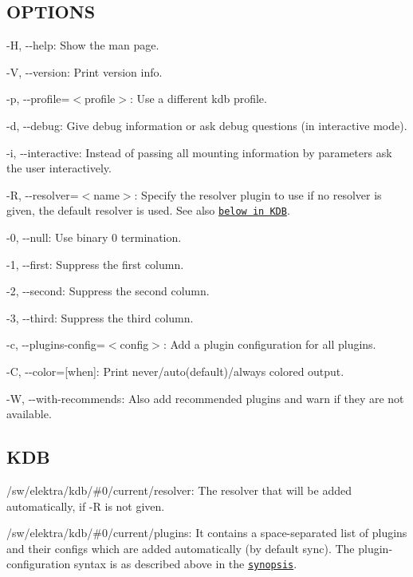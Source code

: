 \subsection*{O\+P\+T\+I\+O\+N\+S}


\begin{DoxyItemize}
\item {\ttfamily -\/\+H}, {\ttfamily -\/-\/help}\+: Show the man page.
\item {\ttfamily -\/\+V}, {\ttfamily -\/-\/version}\+: Print version info.
\item {\ttfamily -\/p}, {\ttfamily -\/-\/profile}=$<$profile$>$\+: Use a different kdb profile.
\item {\ttfamily -\/d}, {\ttfamily -\/-\/debug}\+: Give debug information or ask debug questions (in interactive mode).
\item {\ttfamily -\/i}, {\ttfamily -\/-\/interactive}\+: Instead of passing all mounting information by parameters ask the user interactively.
\item {\ttfamily -\/\+R}, {\ttfamily -\/-\/resolver}=$<$name$>$\+: Specify the resolver plugin to use if no resolver is given, the default resolver is used. See also \href{#KDB}{\tt below in K\+D\+B}.
\item {\ttfamily -\/0}, {\ttfamily -\/-\/null}\+: Use binary 0 termination.
\item {\ttfamily -\/1}, {\ttfamily -\/-\/first}\+: Suppress the first column.
\item {\ttfamily -\/2}, {\ttfamily -\/-\/second}\+: Suppress the second column.
\item {\ttfamily -\/3}, {\ttfamily -\/-\/third}\+: Suppress the third column.
\item {\ttfamily -\/c}, {\ttfamily -\/-\/plugins-\/config}=$<$config$>$\+: Add a plugin configuration for all plugins.
\item {\ttfamily -\/\+C}, {\ttfamily -\/-\/color}=\mbox{[}when\mbox{]}\+: Print never/auto(default)/always colored output.
\item {\ttfamily -\/\+W}, {\ttfamily -\/-\/with-\/recommends}\+: Also add recommended plugins and warn if they are not available.
\end{DoxyItemize}

\subsection*{K\+D\+B}


\begin{DoxyItemize}
\item {\ttfamily /sw/elektra/kdb/\#0/current/resolver}\+: The resolver that will be added automatically, if {\ttfamily -\/\+R} is not given.
\item {\ttfamily /sw/elektra/kdb/\#0/current/plugins}\+: It contains a space-\/separated list of plugins and their configs which are added automatically (by default sync). The plugin-\/configuration syntax is as described above in the \href{#SYNOPSIS}{\tt synopsis}.
\end{DoxyItemize}

